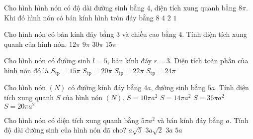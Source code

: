 \begin{ex}
	Cho hình hình nón có độ dài đường sinh bằng $4$, diện tích xung quanh bằng $8\pi$. Khi đó hình nón có bán kính hình tròn đáy bằng
	\choice
	{$8$}
	{$4$}
	{\True $2$}
	{$1$}
\end{ex}
\begin{ex}
	Cho hình nón có bán kính đáy bằng $3$ và chiều cao bằng $4$. Tính diện tích xung quanh của hình nón. 
	\choice
	{$12\pi$}
	{$9\pi$}
	{$30\pi$}
	{\True $15\pi$}
\end{ex}
\begin{ex}
	Cho hình nón có đường sinh $l=5$, bán kính đáy $r=3$. Diện tích toàn phần của hình nón đó là 
	\choice
	{$S_{\mathrm{tp}}=15\pi$}
	{$S_{\mathrm{tp}}=20\pi$}
	{$S_{\mathrm{tp}}=22\pi$}
	{\True $S_{\mathrm{tp}}=24\pi$}
\end{ex}
\begin{ex}
	Cho hình nón $(N)$ có đường kính đáy bằng $4a$, đường sinh bằng $5a$. Tính diện tích xung quanh $S$ của hình nón $(N)$. 
	\choice
	{\True $S=10\pi a^2$}
	{$S=14\pi a^2$}
	{$S=36\pi a^2$}
	{$S=20\pi a^2$}
\end{ex}
\begin{ex}
	Cho hình nón có diện tích xung quanh bằng $5\pi a^2$ và bán kính đáy bằng $a$. Tính độ dài đường sinh của hình nón đã cho?
	\choice
	{$a\sqrt{5}$}
	{$3a\sqrt{2}$}
	{$3a$}
	{\True $5a$}
\end{ex}
